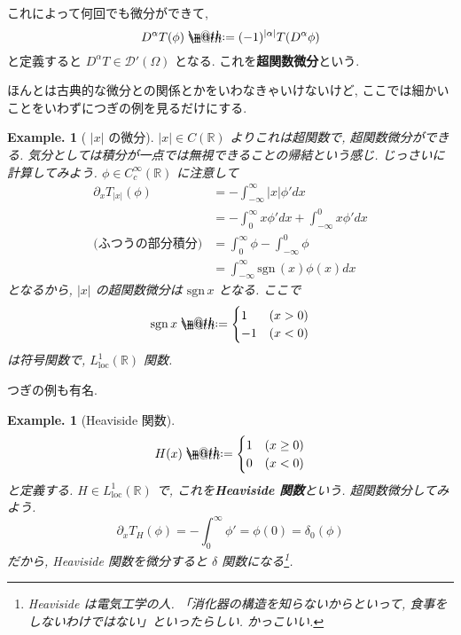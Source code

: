 \documentclass[openany, a4paper, oneside]{jsbook}
\makeatletter
\newcommand*{\defeq}{\mathrel{\rlap{%
\raisebox{0.3ex}{$\m@th\cdot$}}%
\raisebox{-0.3ex}{$\m@th\cdot$}}%
=}
\theoremstyle{break}
\theoremstyle{breakdefn}
\newtheorem{ex}[thm]{Example.}
\newcommand{\abs}[1]{\left|#1\right|}
\newcommand{\Loneloc}{L_{\mathrm{loc}}^1}
\newcommand{\upbf}[1]{\textup{\textbf{#1}}}
\newcommand{\sgn}{\mathrm{sgn}\,}
\makeatother
\begin{document}
これによって何回でも微分ができて,
\begin{equation}
 D^{\alpha}T (\phi)
 \defeq
 (-1)^{|\alpha|}T (D^{\alpha}\phi)
\end{equation}
と定義すると $D^{\alpha}T \in \mathcal{D}'(\Omega)$ となる.
これを\textbf{超関数微分}という.

ほんとは古典的な微分との関係とかをいわなきゃいけないけど,
ここでは細かいことをいわずにつぎの例を見るだけにする.

\begin{ex}[ $\abs{x}$ の微分]
 $|x| \in C (\mathbb{R})$ よりこれは超関数で, 超関数微分ができる.
 気分としては積分が一点では無視できることの帰結という感じ.
 じっさいに計算してみよう.
 $\phi \in C_c^{\infty}(\mathbb{R})$ に注意して
 \begin{equation}
  \begin{split}
   \partial_x T_{|x|}(\phi)
   &=
   -\int_{-\infty}^{\infty}|x|\phi'dx \\
   &=
   -\int_0^{\infty}x\phi'dx + \int_{-\infty}^0x\phi'dx \\
   \text{(ふつうの部分積分)}
   &=
   \int_0^{\infty}\phi - \int_{-\infty}^0\phi \\
   &=
   \int_{-\infty}^{\infty} \sgn (x) \phi (x) dx
  \end{split}
 \end{equation}
となるから, $\abs{x}$ の超関数微分は $\sgn x$ となる.
ここで
\begin{equation}
 \sgn x
 \defeq
 \begin{cases}
  1 & (x > 0) \\
  -1 & (x < 0)
 \end{cases}
\end{equation}
は符号関数で, $\Loneloc (\mathbb{R})$ 関数.
\end{ex}

つぎの例も有名.
\begin{ex}[Heaviside 関数]
 \begin{equation}
  H (x)
  \defeq
  \begin{cases}
   1 & (x \ge 0) \\
   0 & (x < 0)
  \end{cases}
 \end{equation}
 と定義する.
 $H \in \Loneloc (\mathbb{R})$ で, これを\upbf{Heaviside 関数}という.
 超関数微分してみよう.
 \begin{equation}
  \partial_x T_H (\phi)
  =
  -\int_0^{\infty}\phi'
  =
  \phi (0)
  =
  \delta_0 (\phi)
 \end{equation}
 だから, Heaviside 関数を微分すると $\delta$ 関数になる\footnote{Heaviside は電気工学の人.
「消化器の構造を知らないからといって, 食事をしないわけではない」といったらしい.
かっこいい.
 }.
\end{ex}
\end{document}
